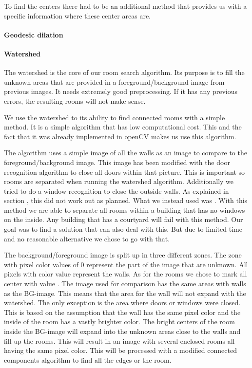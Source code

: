 To find the centers there had to be an additional method that provides us with a specific information where these center areas are.

\paragraph{Geodesic dilation}
\paragraph{Watershed}
\label{subsubsub:watershed}

The watershed is the core of our room search algorithm. Its purpose is to fill  the unknown areas that are provided in a foreground/background image from previous images. It needs extremely good preprocessing. If it has any previous errors, the resulting rooms will not make sense.

We use the watershed to its ability to find connected rooms with a simple method. It is a simple algorithm that has low computational cost. This and the fact that it was already implemented in openCV makes us use this algorithm.

The algorithm uses a simple image of all the walls as an image to compare to the foreground/background image. This image has been modified with the door recognition algorithm to close all doors within that picture. This is important so rooms are separated when running the watershed algorithm. Additionally we tried to do a window recognition to close the outside walls. As explained in section , this did not work out as planned. What we instead used was . With this method we are able to separate all rooms within a building that has no windows on the inside. Any building that has a courtyard will fail with this method. Our goal was to find a solution that can also deal with this. But due to limited time and no reasonable alternative we chose to go with that.

The background/foreground image is split up in three different zones. The zone with pixel color values of 0 represent the part of the image that are unknown. All pixels with color value  represent the walls. As for the rooms we chose to mark all center with value . The image used for comparison has the same areas with walls as the BG-image. This means that the area for the wall will not expand with the watershed. The only exception is the area where doors or windows were closed. This is based on the assumption that the wall has the same pixel color and the inside of the room has a vastly brighter color.
The bright centers of the room inside the BG-image will expand into the unknown areas close to the walls and fill up the rooms. This will result in an image with several enclosed rooms all having the same pixel color. This will be processed with a modified connected components algorithm to find all the edges or the room.

